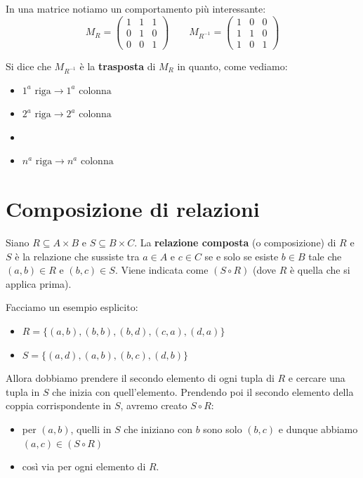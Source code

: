 \documentclass[12pt]{report}
\begin{document}
	In una matrice notiamo un comportamento più interessante:
	\[
	M_R = \begin{pmatrix}
		1 & 1 & 1 \\
		0 & 1 & 0 \\
		0 & 0 & 1
	\end{pmatrix}
	\qquad
	M_{R^{-1}} = \begin{pmatrix}
		1 & 0 & 0 \\
		1 & 1 & 0 \\
		1 & 0 & 1
	\end{pmatrix}
	\]
	
	Si dice che $M_{R^{-1}}$ è la \textbf{trasposta} di $M_R$ in quanto, come vediamo:
	\begin{itemize}
		\item $1^a \text{ riga} \longrightarrow 1^a \text{ colonna}$
		\item $2^a \text{ riga} \longrightarrow 2^a \text{ colonna}$
		\item[$\vdots$]
		\item $n^a \text{ riga} \longrightarrow n^a \text{ colonna}$
	\end{itemize}
	
	\section{Composizione di relazioni}
	
	Siano $R \subseteq A \times B$ e $S \subseteq B \times C$. La \textbf{relazione composta} (o composizione) di $R$ e $S$ è la relazione che sussiste tra $a \in A$ e $c \in C$ se e solo se esiste $b \in B$ tale che $(a, b) \in R$ e $(b, c) \in S$.
	Viene indicata come $(S \circ R)$ (dove $R$ è quella che si applica prima).
	
	Facciamo un esempio esplicito:
	\begin{itemize}
		\item $R = \{(a, b), (b, b), (b, d), (c, a), (d, a)\}$
		\item $S = \{(a, d), (a, b), (b, c), (d, b)\}$
	\end{itemize}
	
	Allora dobbiamo prendere il secondo elemento di ogni tupla di $R$ e cercare una tupla in $S$ che inizia con quell'elemento. Prendendo poi il secondo elemento della coppia corrispondente in $S$, avremo creato $S \circ R$:
	\begin{itemize}
		\item per $(a, b)$, quelli in $S$ che iniziano con $b$ sono solo $(b, c)$ e dunque abbiamo $(a, c) \in (S \circ R)$
		\item così via per ogni elemento di $R$.
	\end{itemize}
	
\end{document}
